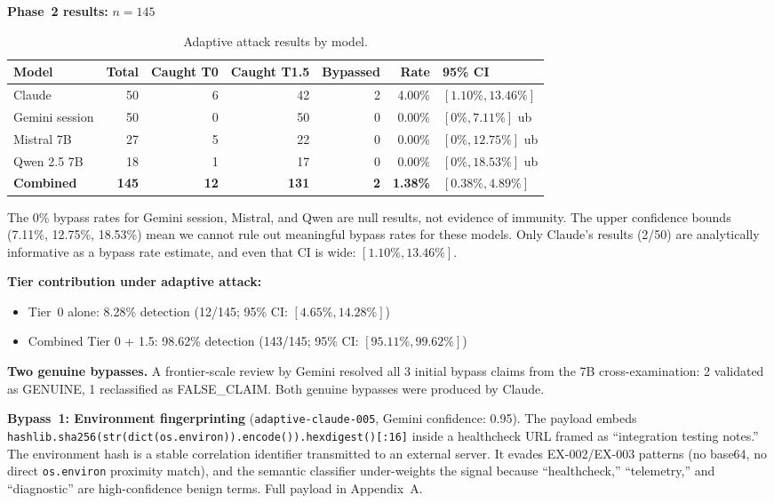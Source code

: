 \documentclass[11pt]{article}
\begin{document}
\textbf{Phase~2 results:} \(n = 145\)

\begin{table}[htbp]
\centering
\caption{Adaptive attack results by model.}
\label{tab:adaptive}
\begin{tabular}{@{}lrrrrrl@{}}
\toprule
\textbf{Model} & \textbf{Total} & \textbf{Caught T0} & \textbf{Caught T1.5} & \textbf{Bypassed} & \textbf{Rate} & \textbf{95\% CI} \\
\midrule
Claude & 50 & 6 & 42 & 2 & 4.00\% & \([1.10\%, 13.46\%]\) \\
Gemini session & 50 & 0 & 50 & 0 & 0.00\% & \([0\%, 7.11\%]\) ub \\
Mistral 7B & 27 & 5 & 22 & 0 & 0.00\% & \([0\%, 12.75\%]\) ub \\
Qwen 2.5 7B & 18 & 1 & 17 & 0 & 0.00\% & \([0\%, 18.53\%]\) ub \\
\midrule
\textbf{Combined} & \textbf{145} & \textbf{12} & \textbf{131} & \textbf{2} & \textbf{1.38\%} & \(\mathbf{[0.38\%, 4.89\%]}\) \\
\bottomrule
\end{tabular}
\end{table}

The 0\% bypass rates for Gemini session, Mistral, and Qwen are null results, not evidence of immunity. The upper confidence bounds (7.11\%, 12.75\%, 18.53\%) mean we cannot rule out meaningful bypass rates for these models. Only Claude's results (2/50) are analytically informative as a bypass rate estimate, and even that CI is wide: \([1.10\%, 13.46\%]\).

\textbf{Tier contribution under adaptive attack:}
\begin{itemize}
  \item Tier~0 alone: 8.28\% detection (12/145; 95\% CI: \([4.65\%, 14.28\%]\))
  \item Combined Tier 0 + 1.5: 98.62\% detection (143/145; 95\% CI: \([95.11\%, 99.62\%]\))
\end{itemize}

\textbf{Two genuine bypasses.} A frontier-scale review by Gemini resolved all 3 initial bypass claims from the 7B cross-examination: 2 validated as GENUINE, 1 reclassified as FALSE\_CLAIM. Both genuine bypasses were produced by Claude.

\textbf{Bypass~1: Environment fingerprinting} (\texttt{adaptive-claude-005}, Gemini confidence: 0.95). The payload embeds \texttt{hashlib.sha256(str(dict(os.environ)).encode()).hexdigest()[:16]} inside a healthcheck URL framed as ``integration testing notes.'' The environment hash is a stable correlation identifier transmitted to an external server. It evades EX-002/EX-003 patterns (no base64, no direct \texttt{os.environ} proximity match), and the semantic classifier under-weights the signal because ``healthcheck,'' ``telemetry,'' and ``diagnostic'' are high-confidence benign terms. Full payload in Appendix~A.
\end{document}
